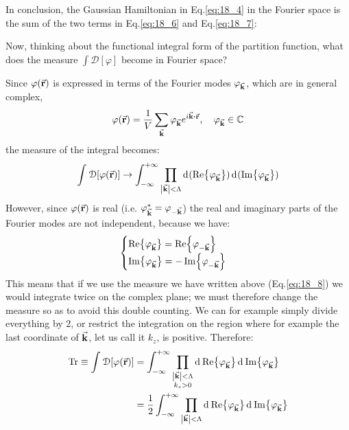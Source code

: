 \documentclass[../main/main.tex]{subfiles}
\begin{document}
In conclusion, the Gaussian Hamiltonian in Eq.\eqref{eq:18_4} in the Fourier space is the sum of the two terms in Eq.\eqref{eq:18_6} and Eq.\eqref{eq:18_7}:


Now, thinking about the functional integral form of the partition function, what does the measure \( \int \mathcal{D} [\varphi ] \)  become in Fourier space?

Since \( \varphi(\va{r}) \)  is expressed in terms of the Fourier modes \( \varphi_{\va{k}} \), which are in general complex,
\begin{equation*}
  \varphi (\va{r}) = \frac{1}{V} \sum_{\va{k}}^{} \varphi _{\va{k}} e^{i \va{k} \vdot \va{r}}, \quad \varphi _{\va{k}} \in \mathbb{C}
\end{equation*}
the measure of the integral becomes:
\begin{equation}
  \int_{}^{} \mathcal{D} \qty[\varphi (\va{r})] \rightarrow \int_{- \infty }^{+ \infty } \prod_{\abs{\va{k}} < \Lambda  }^{}   \dd[]{(\Re{\varphi _{\va{k}}})}   \dd[]{(\Im{\varphi _{\va{k}}})}
  \label{eq:18_8}
\end{equation}
However, since \( \varphi (\va{r} ) \) is real (i.e. \( \varphi _{\va{k}}^* = \varphi _{-\va{k}}\)) the real and imaginary parts of the Fourier modes are not independent, because we have:
\begin{equation*}
  \begin{cases}
   \Re {\varphi _{\va{k}}} = \Re {\varphi _{-\va{k}}} \\
  \Im{\varphi _{\va{k}}} = -\Im {\varphi _{-\va{k}}}
  \end{cases}
\end{equation*}
This means that if we use the measure we have written above (Eq.\eqref{eq:18_8}) we would integrate twice on the complex plane; we must therefore change the measure so as to avoid this double counting. We can for example simply divide everything by \( 2 \), or restrict the integration on the region where for example the last coordinate of \( \va{k} \), let us call it \( k_z \), is positive. Therefore:
\begin{equation}
\begin{split}
  \Tr \equiv   \int_{}^{} \mathcal{D} \qty[\varphi (\va{r})]  & =
  \int_{- \infty }^{+ \infty } \prod_{\substack{ \abs{\va{k}} < \Lambda   \\ k_z > 0 } }^{}   \dd[]{\Re {\varphi _{\va{k}}}}  \dd[]{\Im {\varphi _{\va{k}}}} \\
  &= \frac{1}{2} \int_{- \infty }^{+ \infty } \prod_{\substack{ \abs{\va{k}} < \Lambda    } }^{}   \dd[]{\Re {\varphi _{\va{k}}}}  \dd[]{\Im {\varphi _{\va{k}}}}
\end{split}
\end{equation}
\end{document}
